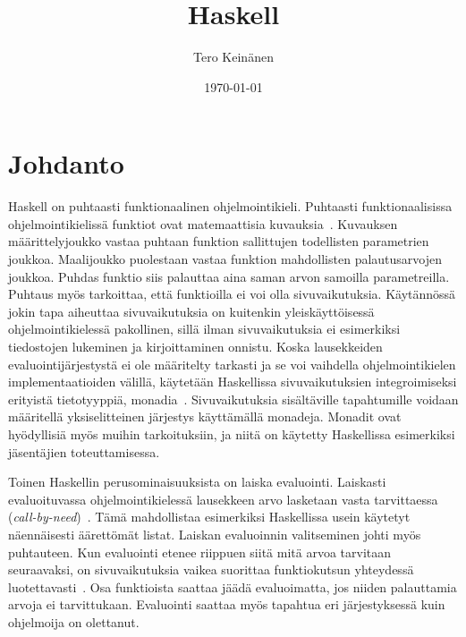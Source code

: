 \documentclass[grading, english, finnish]{tktltiki2}
\title{Haskell}
\author{Tero Keinänen}
\date{\today}
\theoremstyle{definition}
\theoremstyle{remark}
\begin{document}

\frontmatter      %

\maketitle        %

\tableofcontents  %


\mainmatter       %

\section{Johdanto}

Haskell on puhtaasti funktionaalinen ohjelmointikieli. Puhtaasti funktionaalisissa ohjelmointikielissä funktiot ovat matemaattisia kuvauksia~\cite[s.~1]{Sab98}. Kuvauksen määrittelyjoukko vastaa puhtaan funktion sallittujen todellisten parametrien joukkoa. Maalijoukko puolestaan vastaa funktion mahdollisten palautusarvojen joukkoa. Puhdas funktio siis palauttaa aina saman arvon samoilla parametreilla. Puhtaus myös tarkoittaa, että funktioilla ei voi olla sivuvaikutuksia. Käytännössä jokin tapa aiheuttaa sivuvaikutuksia on kuitenkin yleiskäyttöisessä ohjelmointikielessä pakollinen, sillä ilman sivuvaikutuksia ei esimerkiksi tiedostojen lukeminen ja kirjoittaminen onnistu. Koska lausekkeiden evaluointijärjestystä ei ole määritelty tarkasti ja se voi vaihdella ohjelmointikielen implementaatioiden välillä, käytetään Haskellissa sivuvaikutuksien integroimiseksi erityistä tietotyyppiä, monadia~\cite[luku~7]{Mar10}. Sivuvaikutuksia sisältäville tapahtumille voidaan määritellä yksiselitteinen järjestys käyttämällä monadeja. Monadit ovat hyödyllisiä myös muihin tarkoituksiin, ja niitä on käytetty Haskellissa esimerkiksi jäsentäjien toteuttamisessa.

Toinen Haskellin perusominaisuuksista on laiska evaluointi. Laiskasti evaluoituvassa ohjelmointikielessä lausekkeen arvo lasketaan vasta tarvittaessa (\emph{call-by-need})~\cite[s.~12-8]{Hud07}. Tämä mahdollistaa esimerkiksi Haskellissa usein käytetyt näennäisesti äärettömät listat. Laiskan evaluoinnin valitseminen johti myös puhtauteen. Kun evaluointi etenee riippuen siitä mitä arvoa tarvitaan seuraavaksi, on sivuvaikutuksia vaikea suorittaa funktiokutsun yhteydessä luotettavasti~\cite[s.~12-8]{Hud07}. Osa funktioista saattaa jäädä evaluoimatta, jos niiden palauttamia arvoja ei tarvittukaan. Evaluointi saattaa myös tapahtua eri järjestyksessä kuin ohjelmoija on olettanut.
\end{document}
